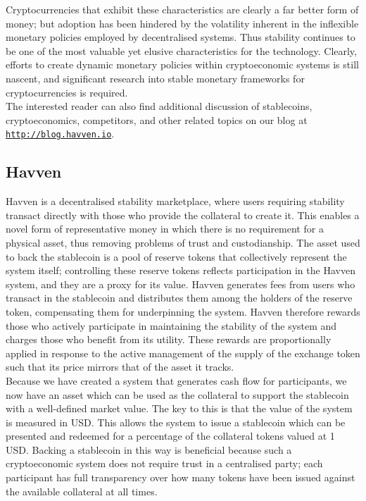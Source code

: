 \noindent Cryptocurrencies that exhibit these characteristics are clearly a far better form of money; but adoption has been hindered by the volatility inherent in the inflexible monetary policies employed by decentralised systems. Thus stability continues to be one of the most valuable yet elusive characteristics for the technology. Clearly, efforts to create dynamic monetary policies within cryptoeconomic systems is still nascent, and significant research into stable monetary frameworks for cryptocurrencies is required. \\

\noindent The interested reader can also find additional discussion of stablecoins,
cryptoeconomics, competitors, and other related topics on our blog at \href{http://blog.havven.io}{\texttt{http://blog.havven.io}}.

\subsection{Havven}

\noindent Havven is a decentralised stability marketplace, where users requiring stability transact directly with those who provide the collateral to create it. This enables a novel form of representative money in which there is no requirement for a physical asset, thus removing problems of trust and custodianship. The asset used to back the stablecoin is a pool of reserve tokens that collectively represent the system itself; controlling these reserve tokens reflects participation in the Havven system, and they are a proxy for its value. Havven generates fees from users who transact in the stablecoin and distributes them among the holders of the reserve token, compensating them for underpinning the system. Havven therefore rewards those who actively participate in maintaining the stability of the system and charges those who benefit from its utility. These rewards are proportionally applied in response to the active management of the supply of the exchange token such that its price mirrors that of the asset it tracks. \\

\noindent Because we have created a system that generates cash flow for participants, we now have an asset which can be used as the collateral to support the stablecoin with a well-defined market value. The key to this is that the value of the system is measured in USD. This allows the system to issue a stablecoin which can be presented and redeemed for a percentage of the collateral tokens valued at 1 USD. Backing a stablecoin in this way is beneficial because such a cryptoeconomic system does not require trust in a centralised party; each participant has full transparency over how many tokens have been issued against the available collateral at all times. \\

